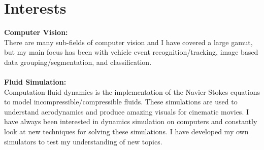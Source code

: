 \documentclass[]{friggeri-cv}
\begin{document}
\section{Interests}
    {\textbf{Computer Vision:}}\\
    {There are many sub-fields of computer vision and I have covered a large gamut, but my main focus has been with vehicle event recognition/tracking, image based data grouping/segmentation, and classification.}\\ \\
    {\textbf{Fluid Simulation:}}\\
    {Computation fluid dynamics is the implementation of the Navier Stokes equations to model incompressible/compressible fluids. These simulations are used to understand aerodynamics and produce amazing visuals for cinematic movies. I have always been interested in dynamics simulation on computers and constantly look at new techniques for solving these simulations. I have developed my own simulators to test my understanding of new topics.}

\end{document}
